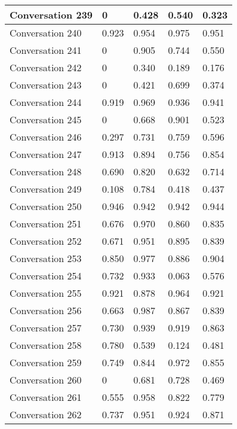 \begin{table}[]
\begin{tabular}{|l|l|l|l|l|}
Conversation 239 & 0        & 0.428 & 0.540       & 0.323   \\ \hline
Conversation 240 & 0.923    & 0.954 & 0.975       & 0.951   \\ \hline
Conversation 241 & 0        & 0.905 & 0.744       & 0.550   \\ \hline
Conversation 242 & 0        & 0.340 & 0.189       & 0.176   \\ \hline
Conversation 243 & 0        & 0.421 & 0.699       & 0.374   \\ \hline
Conversation 244 & 0.919    & 0.969 & 0.936       & 0.941   \\ \hline
Conversation 245 & 0        & 0.668 & 0.901       & 0.523   \\ \hline
Conversation 246 & 0.297    & 0.731 & 0.759       & 0.596   \\ \hline
Conversation 247 & 0.913    & 0.894 & 0.756       & 0.854   \\ \hline
Conversation 248 & 0.690    & 0.820 & 0.632       & 0.714   \\ \hline
Conversation 249 & 0.108    & 0.784 & 0.418       & 0.437   \\ \hline
Conversation 250 & 0.946    & 0.942 & 0.942       & 0.944   \\ \hline
Conversation 251 & 0.676    & 0.970 & 0.860       & 0.835   \\ \hline
Conversation 252 & 0.671    & 0.951 & 0.895       & 0.839   \\ \hline
Conversation 253 & 0.850    & 0.977 & 0.886       & 0.904   \\ \hline
Conversation 254 & 0.732    & 0.933 & 0.063       & 0.576   \\ \hline
Conversation 255 & 0.921    & 0.878 & 0.964       & 0.921   \\ \hline
Conversation 256 & 0.663    & 0.987 & 0.867       & 0.839   \\ \hline
Conversation 257 & 0.730    & 0.939 & 0.919       & 0.863   \\ \hline
Conversation 258 & 0.780    & 0.539 & 0.124       & 0.481   \\ \hline
Conversation 259 & 0.749    & 0.844 & 0.972       & 0.855   \\ \hline
Conversation 260 & 0        & 0.681 & 0.728       & 0.469   \\ \hline
Conversation 261 & 0.555    & 0.958 & 0.822       & 0.779   \\ \hline
Conversation 262 & 0.737    & 0.951 & 0.924       & 0.871   \\ \hline

\end{tabular}
\end{table}
